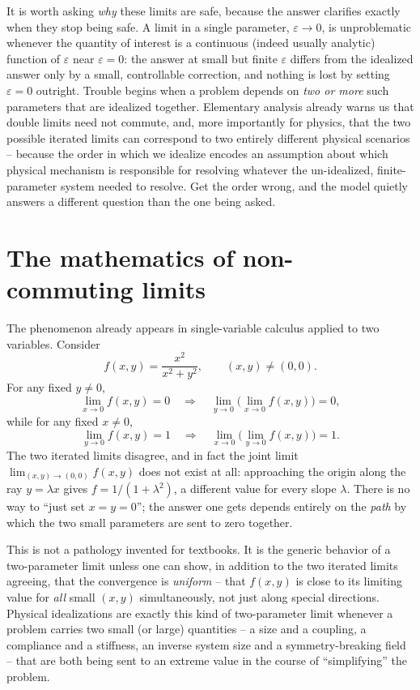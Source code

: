 It is worth asking \emph{why} these limits are safe, because the
answer clarifies exactly when they stop being safe. A limit in a
single parameter, $\varepsilon\to0$, is unproblematic whenever
the quantity of interest is a continuous (indeed usually
analytic) function of $\varepsilon$ near $\varepsilon=0$: the
answer at small but finite $\varepsilon$ differs from the
idealized answer only by a small, controllable correction, and
nothing is lost by setting $\varepsilon=0$ outright. Trouble
begins when a problem depends on \emph{two or more} such
parameters that are idealized together. Elementary analysis
already warns us that double limits need not commute, and, more
importantly for physics, that the two possible iterated limits
can correspond to two entirely different physical scenarios --
because the order in which we idealize encodes an assumption
about which physical mechanism is responsible for resolving
whatever the un-idealized, finite-parameter system needed to
resolve. Get the order wrong, and the model quietly answers a
different question than the one being asked.

\section{The mathematics of non-commuting limits}
\label{limits:math}
The phenomenon  already appears in
single-variable calculus applied to two variables. Consider
\begin{equation}
f(x,y) = \frac{x^2}{x^2+y^2}, \qquad (x,y)\neq(0,0).
\end{equation}
For any fixed $y\neq0$,
\begin{equation}
\lim_{x\to0} f(x,y) = 0 \quad\Longrightarrow\quad
    \lim_{y\to0}\Big(\lim_{x\to0}f(x,y)\Big) = 0,
\end{equation}
while for any fixed $x\neq0$,
\begin{equation}
\lim_{y\to0} f(x,y) = 1 \quad\Longrightarrow\quad
    \lim_{x\to0}\Big(\lim_{y\to0}f(x,y)\Big) = 1.
\end{equation}
The two iterated limits disagree, and in fact the joint limit
$\lim_{(x,y)\to(0,0)}f(x,y)$ does not exist at all: approaching
the origin along the ray $y=\lambda x$ gives $f =
1/(1+\lambda^2)$, a different value for every slope $\lambda$.
There is no way to ``just set $x=y=0$''; the answer one gets
depends entirely on the \emph{path} by which the two small
parameters are sent to zero together.

This is not a pathology invented for textbooks. It is the
generic behavior of a two-parameter limit unless one can show,
in addition to the two iterated limits agreeing, that the
convergence is \emph{uniform} -- that $f(x,y)$ is close to its
limiting value for \emph{all} small $(x,y)$ simultaneously, not
just along special directions. Physical idealizations are
exactly this kind of two-parameter limit whenever a problem
carries two small (or large) quantities -- a size and a
coupling, a compliance and a stiffness, an inverse system size
and a symmetry-breaking field -- that are both being sent to an
extreme value in the course of ``simplifying'' the problem.

